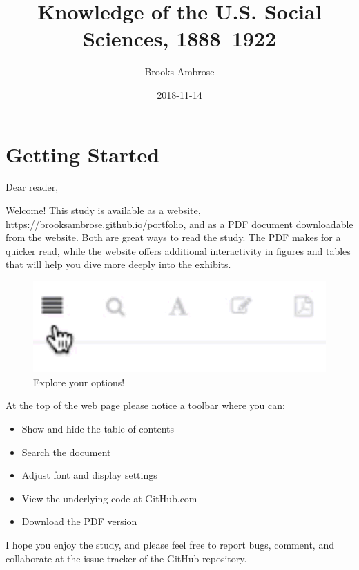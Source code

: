 \documentclass[]{book}
\title{Knowledge of the U.S. Social Sciences, 1888--1922}
\author{Brooks Ambrose}
\date{2018-11-14}
\providecommand{\tightlist}{%
  \setlength{\itemsep}{0pt}\setlength{\parskip}{0pt}}
\begin{document}
\maketitle

{
\setcounter{tocdepth}{2}
\tableofcontents
}
\listoftables
\listoffigures
\chapter*{Getting Started}\label{getting-started}


Dear reader,

Welcome! This study is available as a website,
\url{https://brooksambrose.github.io/portfolio}, and as a PDF document
downloadable from the website. Both are great ways to read the study.
The PDF makes for a quicker read, while the website offers additional
interactivity in figures and tables that will help you dive more deeply
into the exhibits.

\begin{figure}

{\centering \includegraphics{img/toolbar} 

}

\caption{Explore your options!}\label{fig:toolbar}
\end{figure}

At the top of the web page please notice a toolbar where you can:

\begin{itemize}
\tightlist
\item
  Show and hide the table of contents
\item
  Search the document
\item
  Adjust font and display settings
\item
  View the underlying code at GitHub.com
\item
  Download the PDF version
\end{itemize}

I hope you enjoy the study, and please feel free to report bugs,
comment, and collaborate at the issue tracker of the GitHub repository.
\end{document}
